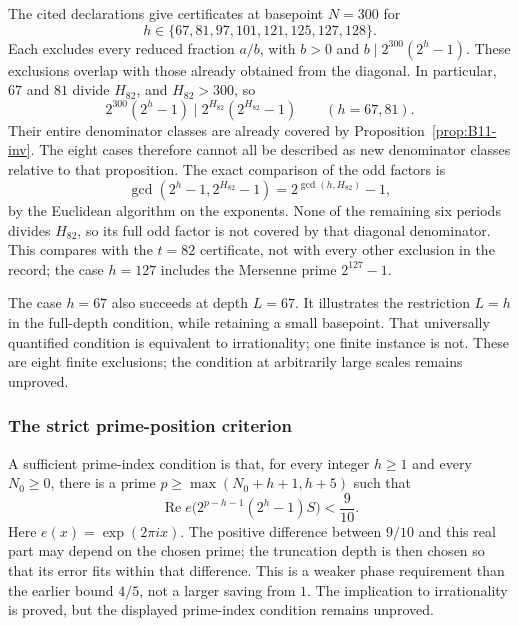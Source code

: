 \begin{obs}
The cited declarations give certificates at basepoint $N=300$ for
\[
 h\in\{67,81,97,101,121,125,127,128\}.
\]
Each excludes every reduced fraction $a/b$, with $b>0$ and
$b\mid2^{300}(2^h-1)$. These exclusions overlap with those already
obtained from the diagonal. In particular, $67$ and $81$ divide $H_{82}$,
and $H_{82}>300$, so
\[
 2^{300}(2^h-1)\mid2^{H_{82}}(2^{H_{82}}-1)
 \qquad(h=67,81).
\]
Their entire denominator classes are already covered by
Proposition~\ref{prop:B11-inv}. The eight cases therefore cannot all
be described as new denominator classes relative to that proposition.
The exact comparison of the odd factors is
\[
 \gcd(2^h-1,2^{H_{82}}-1)=2^{\gcd(h,H_{82})}-1,
\]
by the Euclidean algorithm on the exponents. None of the remaining
six periods divides $H_{82}$, so its full odd factor is not covered
by that diagonal denominator. This compares with the $t=82$ certificate,
not with every other exclusion in the record; the case $h=127$ includes
the Mersenne prime $2^{127}-1$.

The case $h=67$ also succeeds at depth $L=67$. It illustrates the
restriction $L=h$ in the full-depth condition, while retaining a small
basepoint. That universally quantified condition is equivalent to
irrationality; one finite instance is not.
\quad {}
\quad {}
\quad {}
These are eight finite exclusions; the condition at arbitrarily large
scales remains unproved.
\end{obs}

\subsubsection{The strict prime-position criterion}

A sufficient prime-index condition is that, for every integer $h\ge1$
and every $N_0\ge0$, there is a prime
$p\ge\max(N_0+h+1,h+5)$ such that
\[
 \operatorname{Re}e\bigl(2^{p-h-1}(2^h-1)S\bigr)<\frac9{10}.
\]
Here $e(x)=\exp(2\pi i x)$. The positive difference between $9/10$ and
this real part may depend on the chosen prime; the truncation depth is
then chosen so that its error fits within that difference. This is a
weaker phase requirement than the earlier bound $4/5$, not a larger
saving from $1$. The implication to irrationality is proved, but the
displayed prime-index condition remains unproved.

